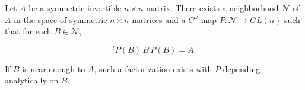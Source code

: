Let $A$ be a symmetric invertible $n \times n$ matrix. There exists a neighborhood $\mathcal{N}$ of $A$ in the space of symmetric $n \times n$ matrices and a $C^\omega$ map $P: \mathcal{N} \rightarrow GL(n)$ such that for each $B \in \mathcal{N}$,

$${}^t P(B) \, B \, P(B) = A.$$

If $B$ is near enough to $A$, such a factorization exists with $P$ depending analytically on $B$.
